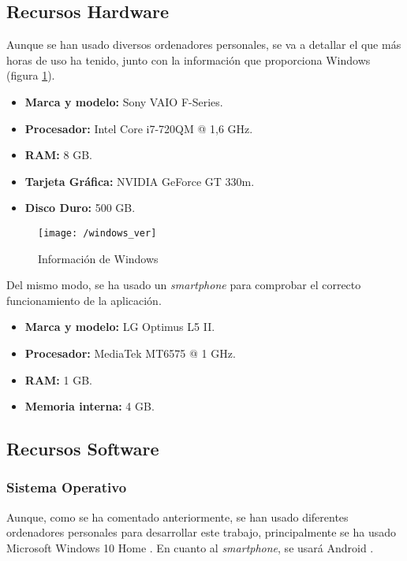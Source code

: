 \subsection{Recursos Hardware}
Aunque se han usado diversos ordenadores personales, se va a detallar el que más horas de uso ha tenido, junto con la información que proporciona Windows (figura \ref{fig:winver}).

\begin{itemize}
	\item \textbf{Marca y modelo:} Sony VAIO F-Series.
	\item \textbf{Procesador:} Intel\textregistered{ } Core\texttrademark{ } i7-720QM @ 1,6 \acf{GHz}.
	\item \textbf{RAM:} 8 \acf{GB}.
	\item \textbf{Tarjeta Gráfica:} NVIDIA GeForce GT 330m.
	\item \textbf{Disco Duro:} 500 \acs{GB}.
\end{itemize}

\begin{figure}[!h]
	\begin{center}
		\texttt{[image: /windows\_ver]}
		\caption{Información de Windows}
		\label{fig:winver}
	\end{center}
\end{figure}

\newpage

Del mismo modo, se ha usado un \textit{smartphone} para comprobar el correcto funcionamiento de la aplicación.

\begin{itemize}
	\item \textbf{Marca y modelo:} LG Optimus L5 II.
	\item \textbf{Procesador:} MediaTek MT6575 @ 1 \acs{GHz}.
	\item \textbf{RAM:} 1 \acs{GB}.
	\item \textbf{Memoria interna:} 4 \acs{GB}.
\end{itemize}

\subsection{Recursos Software}

\subsubsection*{Sistema Operativo}
Aunque, como se ha comentado anteriormente, se han usado diferentes ordenadores personales para desarrollar este trabajo, principalmente se ha usado Microsoft Windows 10 Home \cite{Microsoft}. En cuanto al \textit{smartphone}, se usará Android \cite{Andro}.

